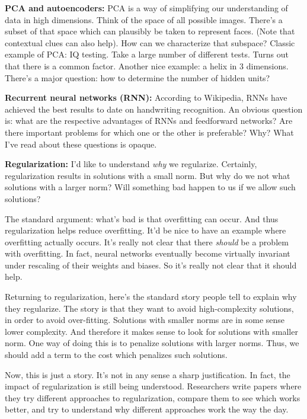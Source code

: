 \documentclass[12pt]{report}
\begin{document}
\textbf{PCA and autoencoders:} PCA is a way of simplifying our
understanding of data in high dimensions.  Think of the space of all
possible images.  There's a subset of that space which can plausibly
be taken to represent faces.  (Note that contextual clues can also
help).  How can we characterize that subspace?  Classic example of
PCA: IQ testing.  Take a large number of different tests.  Turns out
that there is a common factor.  Another nice example: a helix in 3
dimensions.  There's a major question: how to determine the number of
hidden units?

\textbf{Recurrent neural networks (RNN):} According to Wikipedia, RNNs
have achieved the best results to date on handwriting recognition.  An
obvious question is: what are the respective advantages of RNNs and
feedforward networks?  Are there important problems for which one or
the other is preferable?  Why?  What I've read about these questions
is opaque.

\textbf{Regularization:} I'd like to understand \emph{why} we
regularize.  Certainly, regularization results in solutions with a
small norm.  But why do we not what solutions with a larger norm?
Will something bad happen to us if we allow such solutions?

The standard argument: what's bad is that overfitting can occur.  And
thus regularization helps reduce overfitting.  It'd be nice to have an
example where overfitting actually occurs.  It's really not clear that
there \emph{should} be a problem with overfitting.  In fact, neural
networks eventually become virtually invariant under rescaling of
their weights and biases.  So it's really not clear that it should
help.

Returning to regularization, here's the standard story people tell to
explain why they regularize.  The story is that they want to avoid
high-complexity solutions, in order to avoid over-fitting.  Solutions
with smaller norms are in some sense lower complexity.  And therefore
it makes sense to look for solutions with smaller norm.  One way of
doing this is to penalize solutions with larger norms.  Thus, we
should add a term to the cost which penalizes such solutions.

Now, this is just a story.  It's not in any sense a sharp
justification.  In fact, the impact of regularization is still being
understood.  Researchers write papers where they try different
approaches to regularization, compare them to see which works better,
and try to understand why different approaches work the way the day.
\end{document}
